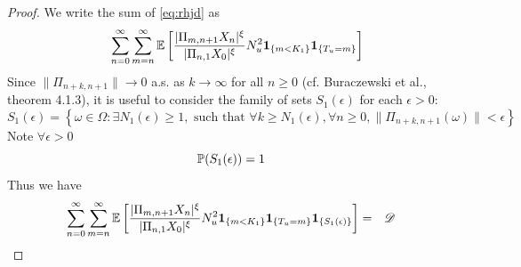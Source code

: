\begin{proof}
  We write the sum of \eqref{eq:rhjd} as
  \begin{eqnarray*}
    &&
    \sum_{n=0}^\infty \sum_{m=n}^\infty
    \E \left[
      {
        |\Pi_{m, n+1} X_n |^{\xi}
        \over
        |\Pi_{n, 1} X_0 |^{\xi}        
      }
      N_u^2
      \1{m < K_1}
      \1{T_u = m}
    \right]
  \end{eqnarray*}
Since $\| \Pi_{n+k,n+1} \| \to 0$ a.s. as $k \to \infty$ for all $n \geq 0$
(cf. Buraczewski et al.\cite{buraczewski:damek:mikosch:2016},
theorem 4.1.3), it is useful to consider the family of sets
$S_1(\epsilon)$ for each $\epsilon > 0$:
\begin{equation}
  \label{eq:S1}
  S_1(\epsilon) = \left\{
    \omega \in \Omega:
    \exists N_1(\epsilon) \geq 1,
    \text{ such that } \forall k \geq N_1(\epsilon),
    \forall n \geq 0,
    \| \Pi_{n+k, n+1}(\omega) \| < \epsilon
  \right\}
\end{equation}
Note $\forall \epsilon > 0$
\[
\P(S_1(\epsilon)) = 1
\]
Thus we have  
  \begin{eqnarray}
    \sum_{n=0}^\infty \sum_{m=n}^\infty
    \E \left[
      {
        |\Pi_{m, n+1} X_n |^{\xi}
        \over
        |\Pi_{n, 1} X_0 |^{\xi}        
      }
      N_u^2
      \1{m < K_1} \1{T_u = m} \1{S_1(\epsilon)}
      \right]
    &=& \mathscr D \label{eq:pkce}
  \end{eqnarray}
  

\end{proof}
